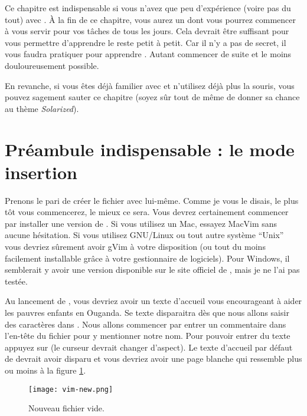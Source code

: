 Ce chapitre est indispensable si vous n'avez que peu d'expérience (voire pas du tout) avec \vim. À la fin de ce chapitre, vous aurez un \vim dont vous pourrez commencer à vous servir pour vos tâches de tous les jours. Cela devrait être suffisant pour vous permettre d'apprendre le reste petit à petit. Car il n'y a pas de secret, il vous faudra pratiquer pour apprendre \vim. Autant commencer de suite et le moins douloureusement possible.

En revanche, si vous êtes déjà familier avec \vim et n'utilisez déjà plus la souris, vous pouvez sagement sauter ce chapitre (soyez sûr tout de même de donner sa chance au thème \emph{Solarized}).

\section{Préambule indispensable : le mode insertion}\label{sec:modeinsertion}

Prenons le pari de créer le fichier \vimrc avec \vim lui-même. Comme je vous le disais, le plus tôt vous commencerez, le mieux ce sera.
Vous devrez certainement commencer par installer une version de \vim. Si vous utilisez un Mac, essayez MacVim  sans aucune hésitation. Si vous utilisez GNU/Linux ou tout autre système ``Unix'' vous devriez sûrement avoir gVim à votre disposition (ou tout du moins facilement installable grâce à votre gestionnaire de logiciels). Pour Windows, il semblerait y avoir une version disponible sur le site officiel de \vim{}, mais je ne l'ai pas testée.

Au lancement de \vim, vous devriez avoir un texte d'accueil vous encourageant à aider les pauvres enfants en Ouganda. Se texte disparaitra dès que nous allons saisir des caractères dans \vim. Nous allons commencer par entrer un commentaire dans l'en-tête du fichier pour y mentionner notre nom. Pour pouvoir entrer du texte appuyez sur \tti (le curseur devrait changer d'aspect). Le texte d'accueil par défaut de \vim devrait avoir disparu et vous devriez avoir une page blanche qui ressemble plus ou moins à la figure \ref{fig:vim-new}. 

\begin{figure}%
  \texttt{[image: vim-new.png]}
  \caption{Nouveau fichier vide.}
  \label{fig:vim-new}
\end{figure}

